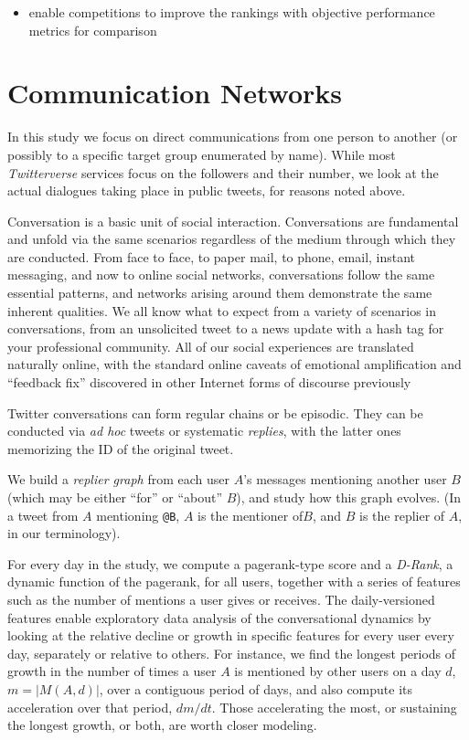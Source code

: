 \documentclass[10pt,oneside]{memoir}
\begin{document}
\begin{Spacing}{2}
\begin{itemize}
\item enable competitions to improve the rankings with objective performance metrics for comparison
\end{itemize}

\pagebreak \section{Communication Networks}
\label{communicationnetworks}

In this study we focus on direct communications from one person to another (or possibly to a specific target group enumerated by name).  While most {\itshape Twitterverse} services focus on the followers and their number, we look at the actual dialogues taking place in public tweets, for reasons noted above.


Conversation is a basic unit of social interaction.  Conversations are fundamental and unfold via the same scenarios regardless of the medium through which they are conducted.  From face to face, to paper mail, to phone, email, instant messaging, and now to online social networks, conversations follow the same essential patterns, and networks arising around them demonstrate the same inherent qualities.  We all know what to expect from a variety of scenarios in conversations, from an unsolicited tweet to a news update with a hash tag for your professional community.  All of our social experiences are translated naturally online, with the standard online caveats of emotional amplification and ``feedback fix'' discovered in other Internet forms of discourse previously


Twitter conversations can form regular chains or be episodic.  They can be conducted via {\itshape ad hoc} tweets or systematic {\itshape replies}, with the latter ones memorizing the ID of the original tweet.


We build a {\itshape replier graph} from each user $A$'s messages mentioning another user $B$ (which may be either ``for'' or ``about'' $B$), and study how this graph evolves.  (In a tweet from $A$ mentioning \verb|@B|,  $A$ is the mentioner of$B$, and $B$ is the replier of $A$, in our terminology). 


For every day in the study, we compute a pagerank-type score and a \emph{D-Rank}, a dynamic function of the pagerank, for all users, together with a series of features such as the number of mentions a user gives or receives. The daily-versioned features enable exploratory data analysis of the conversational dynamics by looking at the relative decline or growth in specific features for every user every day, separately or relative to others.  For instance, we find the longest periods of growth in the number of times a user $A$ is mentioned by other users on a day $d$, $m=|M(A,d)|$, over a contiguous period of days, and also compute its acceleration over that period, $dm/dt$. Those accelerating the most, or sustaining the longest growth, or both, are worth closer modeling.



\end{Spacing}
\end{document}
